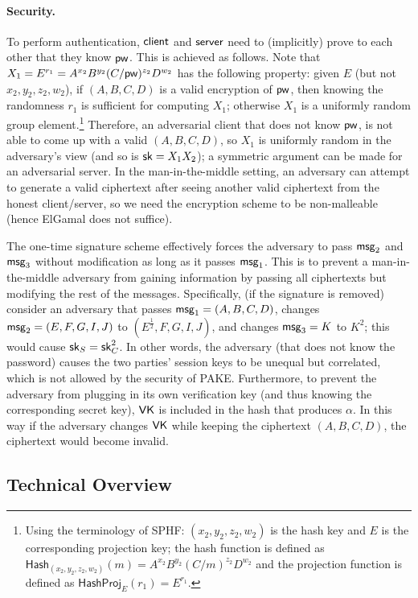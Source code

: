 \paragraph{Security.}
To perform authentication, $\mathsf{client}$ and $\mathsf{server}$ need to (implicitly) prove to each other that they know $\mathsf{pw}$. This is achieved as follows. Note that $X_1 = E^{r_1} = A^{x_2}B^{y_2}(C/\mathsf{pw})^{z_2}D^{w_2}$ has the following property: given $E$ (but not $x_2,y_2,z_2,w_2$), if $(A,B,C,D)$ is a valid encryption of $\mathsf{pw}$, then knowing the randomness $r_1$ is sufficient for computing $X_1$; otherwise $X_1$ is a uniformly random group element.\footnote{Using the terminology of SPHF: $(x_2,y_2,z_2,w_2)$ is the hash key and $E$ is the corresponding projection key; the hash function is defined as $\mathsf{Hash}_{(x_2,y_2,z_2,w_2)}(m) = A^{x_2}B^{y_2}(C/m)^{z_2}D^{w_2}$ and the projection function is defined as $\mathsf{HashProj}_E(r_1) = E^{r_1}$.} Therefore, an adversarial client that does not know $\mathsf{pw}$, is not able to come up with a valid $(A,B,C,D)$, so $X_1$ is uniformly random in the adversary's view (and so is $\mathsf{sk} = X_1X_2$); a symmetric argument can be made for an adversarial server. In the man-in-the-middle setting, an adversary can attempt to generate a valid ciphertext after seeing another valid ciphertext from the honest client/server, so we need the encryption scheme to be non-malleable (hence ElGamal does not suffice).

The one-time signature scheme effectively forces the adversary to pass $\mathsf{msg}_{2}$ and $\mathsf{msg}_{3}$ without modification as long as it passes $\mathsf{msg}_{1}$. This is to prevent a man-in-the-middle adversary from gaining information by passing all ciphertexts but modifying the rest of the messages. Specifically, (if the signature is removed) consider an adversary that passes $\mathsf{msg}_{1} = (A,B,C,D)$, changes $\mathsf{msg}_{2} = (E,F,G,I,J)$ to $(E^{\frac{1}{2}},F,G,I,J)$, and changes $\mathsf{msg}_{3} = K$ to $K^2$; this would cause $\mathsf{sk}_S = \mathsf{sk}_C^2$. In other words, the adversary (that does not know the password) causes the two parties' session keys to be unequal but correlated, which is not allowed by the security of PAKE. Furthermore, to prevent the adversary from plugging in its own verification key (and thus knowing the corresponding secret key), $\mathsf{VK}$ is included in the hash that produces $\alpha$. In this way if the adversary changes $\mathsf{VK}$ while keeping the ciphertext $(A,B,C,D)$, the ciphertext would become invalid.

\subsection{Technical Overview}

